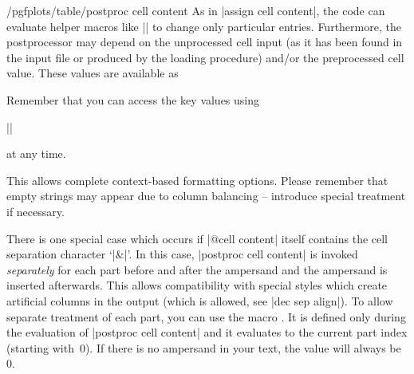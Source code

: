 \begin{codekey}{/pgfplots/table/postproc cell content}
    As in |assign cell content|, the code can evaluate helper macros like
    |\pgfplotstablerow| to change only particular entries. Furthermore, the
    postprocessor may depend on the unprocessed cell input (as it has been
    found in the input file or produced by the loading procedure) and/or the
    preprocessed cell value. These values are available as
    Remember that you can access the key values using

    ||

    at any time.

    This allows complete context-based formatting options. Please remember that
    empty strings may appear due to column balancing -- introduce special
    treatment if necessary.

    There is one special case which occurs if |@cell content| itself contains
    the cell separation character `|&|'. In this case, |postproc cell content|
    is invoked \emph{separately} for each part before and after the ampersand
    and the ampersand is inserted afterwards. This allows compatibility with
    special styles which create artificial columns in the output (which is
    allowed, see |dec sep align|). To allow separate treatment of each part,
    you can use the macro \declareandlabel{\pgfplotstablepartno}. It is defined
    only during the evaluation of |postproc cell content| and it evaluates to
    the current part index (starting with~$0$). If there is no ampersand in
    your text, the value will always be~$0$.


\end{codekey}
